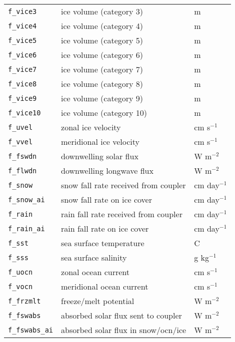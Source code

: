 \begin{center}
\begin{supertabular}{lll}
\texttt{f\_vice3}   & ice volume (category 3)              & m            \\
\texttt{f\_vice4}   & ice volume (category 4)              & m            \\
\texttt{f\_vice5}   & ice volume (category 5)              & m            \\
\texttt{f\_vice6}   & ice volume (category 6)              & m            \\
\texttt{f\_vice7}   & ice volume (category 7)              & m            \\
\texttt{f\_vice8}   & ice volume (category 8)              & m            \\
\texttt{f\_vice9}   & ice volume (category 9)              & m            \\
\texttt{f\_vice10}  & ice volume (category 10)             & m            \\
\texttt{f\_uvel}    & zonal ice velocity                   & cm s$^{-1}$    \\
\texttt{f\_vvel}    & meridional ice velocity              & cm s$^{-1}$    \\
\texttt{f\_fswdn}   & downwelling solar flux               & W m$^{-2}$     \\
\texttt{f\_flwdn}   & downwelling longwave flux            & W m$^{-2}$    \\
\texttt{f\_snow}    & snow fall rate received from coupler & cm day$^{-1}$ \\
\texttt{f\_snow\_ai} & snow fall rate on ice cover       & cm day$^{-1}$ \\
\texttt{f\_rain}    & rain fall rate received from coupler & cm day$^{-1}$ \\
\texttt{f\_rain\_ai} & rain fall rate on ice cover       & cm day$^{-1}$ \\
\texttt{f\_sst}     & sea surface temperature              & C             \\
\texttt{f\_sss}     & sea surface salinity                 & g kg$^{-1}$   \\
\texttt{f\_uocn}    & zonal ocean current                  & cm s$^{-1}$   \\
\texttt{f\_vocn}    & meridional ocean current             & cm s$^{-1}$   \\
\texttt{f\_frzmlt}  & freeze/melt potential                & W m$^{-2}$   \\
\texttt{f\_fswabs}  & absorbed solar flux sent to coupler  & W m$^{-2}$     \\
\texttt{f\_fswabs\_ai} & absorbed solar flux in snow/ocn/ice & W m$^{-2}$     \\

\end{supertabular}
\end{center}

